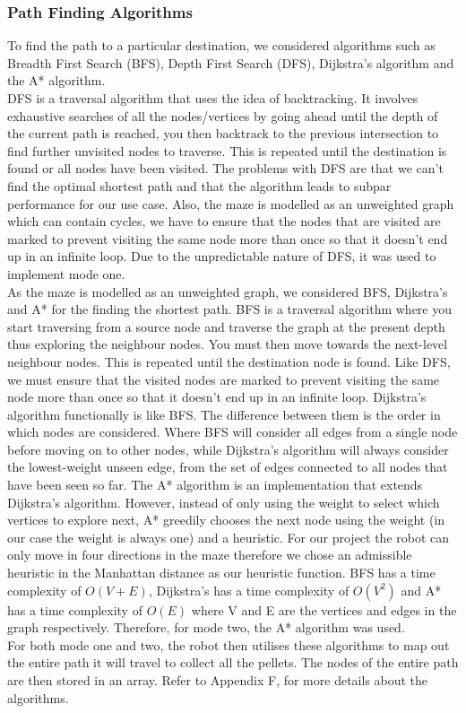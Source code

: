 \subsubsection*{Path Finding Algorithms}
To find the path to a particular destination, we considered algorithms such as Breadth First Search (BFS), Depth First Search (DFS), Dijkstra’s algorithm and the A* algorithm.
\\DFS is a traversal algorithm that uses the idea of backtracking. It involves exhaustive searches of all the nodes/vertices by going ahead until the depth of the current path is reached, you then backtrack to the previous intersection to find further unvisited nodes to traverse. This is repeated until the destination is found or all nodes have been visited. The problems with DFS are that we can't find the optimal shortest path and that the algorithm leads to subpar performance for our use case. Also, the maze is modelled as an unweighted graph which can contain cycles, we have to ensure that the nodes that are visited are marked to prevent visiting the same node more than once so that it doesn't end up in an infinite loop. Due to the unpredictable nature of DFS, it was used to implement mode one.
\\As the maze is modelled as an unweighted graph, we considered BFS, Dijkstra’s and A* for the finding the shortest path. BFS is a traversal algorithm where you start traversing from a source node and traverse the graph at the present depth thus exploring the neighbour nodes.  You must then move towards the next-level neighbour nodes. This is repeated until the destination node is found. Like DFS, we must ensure that the visited nodes are marked to prevent visiting the same node more than once so that it doesn't end up in an infinite loop. Dijkstra's algorithm functionally is like BFS. The difference between them is the order in which nodes are considered. Where BFS will consider all edges from a single node before moving on to other nodes, while Dijkstra's algorithm will always consider the lowest-weight unseen edge, from the set of edges connected to all nodes that have been seen so far. The A* algorithm is an implementation that extends Dijkstra’s algorithm. However, instead of only using the weight to select which vertices to explore next, A* greedily chooses the next node using the weight (in our case the weight is always one) and a heuristic. For our project the robot can only move in four directions in the maze therefore we chose an admissible heuristic in the Manhattan distance as our heuristic function. BFS has a time complexity of $O(V+E)$, Dijkstra's has a time complexity of $O(V^2)$ and A* has a time complexity of $O(E)$ where V and E are the vertices and edges in the graph respectively. Therefore, for mode two, the A* algorithm was used.
\\For both mode one and two, the robot then utilises these algorithms to map out the entire path it will travel to collect all the pellets. The nodes of the entire path are then stored in an array. Refer to Appendix F, for more details about the algorithms.



